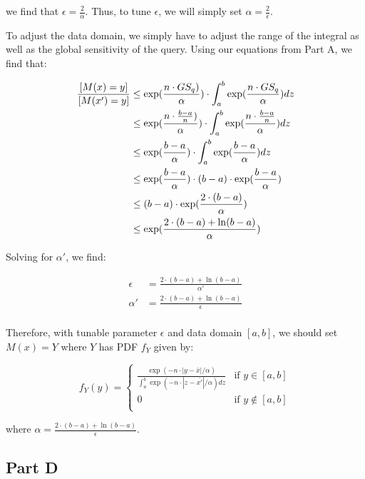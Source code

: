 \documentclass[12pt]{article}
\let\Pr\relax
\DeclareMathOperator*{\Pr}{\mathbb{P}}
\begin{document}
we find that $\epsilon = \frac{2}{\alpha}$. Thus, to tune $\epsilon$, we will simply set $\alpha = \frac{2}{\epsilon}$.

\bigskip

To adjust the data domain, we simply have to adjust the range of the integral as well as the global sensitivity of the query. Using our equations from Part A, we find that:

\begin{align*}
\frac{\Pr[M(x) = y]}{\Pr[M(x') = y]} &\leq \exp(\frac{n \cdot GS_q)}{\alpha})  \cdot \int_a^b \exp(\frac{n \cdot GS_q}{\alpha}) dz \\
&\leq \exp(\frac{n \cdot \frac{b-a}{n})}{\alpha})  \cdot \int_a^b \exp(\frac{n \cdot \frac{b-a}{n}}{\alpha}) dz \\
&\leq \exp(\frac{b-a}{\alpha})  \cdot \int_a^b \exp(\frac{b-a}{\alpha}) dz \\
&\leq \exp(\frac{b-a}{\alpha})  \cdot (b-a) \cdot \exp(\frac{b-a}{\alpha}) \\
&\leq (b-a) \cdot \exp(\frac{2 \cdot (b-a)}{\alpha}) \\
&\leq \exp(\frac{2 \cdot (b-a) + \ln (b-a)}{\alpha}) \\
\end{align*}

Solving for $\alpha'$, we find:

\begin{align*}
\epsilon &= \frac{2 \cdot (b-a) + \ln (b-a)}{\alpha'} \\
\alpha' &= \frac{2 \cdot (b-a) + \ln (b-a)}{\epsilon} \\
\end{align*}

Therefore, with tunable parameter $\epsilon$ and data domain $[a, b]$, we should set $M(x) = Y$ where $Y$ has PDF $f_Y$ given by:

$$
f_Y(y) =
\begin{cases}
\frac{\exp(-n \cdot |y - \bar{x}|/\alpha)}{\int_a^b \exp(-n \cdot |z-\bar{x'}|/\alpha) dz} & \text{if } y \in [a, b] \\
0 & \text{if } y \not\in [a, b] \\
\end{cases}
$$

where $\alpha = \frac{2 \cdot (b-a) + \ln (b-a)}{\epsilon}$.

\newpage

\subsection{Part D}
\end{document}
